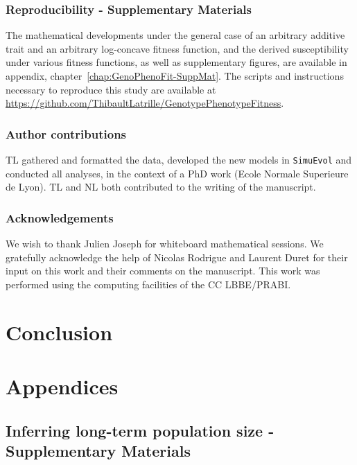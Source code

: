 \documentclass[a4paper,oneside,nobind]{thesis}
\begin{document}
    {\hypersetup{linkcolor=GREYDARK}\minitoc}

    


    \section{Reproducibility - Supplementary Materials}
    The mathematical developments under the general case of an arbitrary additive trait and an arbitrary log-concave fitness function, and the derived susceptibility under various fitness functions, as well as supplementary figures, are available in appendix, chapter~\ref{chap:GenoPhenoFit-SuppMat}.
    The scripts and instructions necessary to reproduce this study are available at \url{https://github.com/ThibaultLatrille/GenotypePhenotypeFitness}.


    \section{Author contributions}
    TL gathered and formatted the data, developed the new models in \texttt{SimuEvol} and conducted all analyses, in the context of a PhD work (Ecole Normale Superieure de Lyon).
    TL and NL both contributed to the writing of the manuscript.


    \section{Acknowledgements}
    We wish to thank Julien Joseph for whiteboard mathematical sessions.
    We gratefully acknowledge the help of Nicolas Rodrigue and Laurent Duret for their input on this work and their comments on the manuscript.
    This work was performed using the computing facilities of the CC LBBE/PRABI.


    \part{Conclusion}
    \label{part:conclusion}
    



    \part{Appendices}

    \thispagestyle{empty}
    \chapter{Inferring long-term population size - Supplementary Materials}
    {\hypersetup{linkcolor=GREYDARK}\minitoc}
    \label{chap:MutSelDrift-SuppMat}
    
\end{document}
